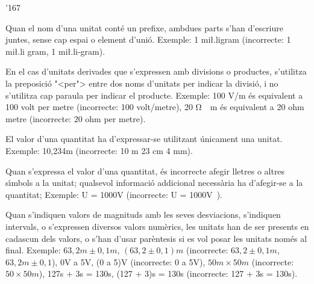 \begin{dinglist}{'167}
 \item Quan el nom d'una unitat
cont\'{e} un prefixe, ambdues parts s'han d'escriure juntes, sense cap espai o element d'uni\'{o}. Exemple: 1
mi{\l.l}igram (incorrecte: 1 mi{\l.l}i gram, 1 mi{\l.l}i-gram).

\item En el cas  d'unitats derivades que s'expressen amb divisions o
productes, s'utilitza la preposici\'{o} {"<}per{">} entre dos noms d'unitats
per indicar la divisi\'{o}, i no s'utilitza cap paraula per indicar el
producte. Exemple: 100 \unit{V/m} \'{e}s equivalent a 100 volt per metre
(incorrecte:
 100 volt/metre), 20 \unit{\ohm\cdot m} \'{e}s equivalent a 20 ohm metre
(incorrecte: 20 ohm per metre).

\item El valor d'una quantitat ha d'expressar-se  utilitzant \'{u}nicament una
unitat. Exemple: 10,234\unit{m} (incorrecte: 10 m 23 cm 4 mm).

\item Quan s'expressa el valor d'una quantitat, \'{e}s incorrecte afegir
lletres o altres s\'{\i}mbols a la unitat; qualsevol informaci\'{o}
addicional necess\`{a}ria ha d'afegir-se a la quantitat; Exemple:
U = 1000\unit{V} (incorrecte: U = 1000\unit{V}).

\item Quan s'indiquen valors de magnituds amb les seves desviacions,
s'indiquen intervals, o s'expressen diversos valors num\`{e}rics, les
unitats han de ser presents en cadascun dels valors, o s'han d'usar
par\`{e}ntesis si es vol posar les unitats nom\'{e}s al final. Exemple:
$63{,}2\unit{m} \pm 0{,}1\unit{m}$, $(63{,}2 \pm 0{,}1)\unit{m}$
(incorrecte: $63{,}2 \pm 0{,}1\unit{m}$, $63{,}2\unit{m} \pm
0{,}1$), 0\unit{V} a 5\unit{V}, (0 a 5)\unit{V} (incorrecte: 0 a
5\unit{V}), $50\unit{m}\times 50\unit{m}$ (incorrecte: $50\times
50\unit{m}$), 127\unit{s} + 3\unit{s} = 130\unit{s}, (127 +
3)\unit{s} = 130\unit{s} (incorrecte: 127 + 3\unit{s} =
130\unit{s}).
\end{dinglist}